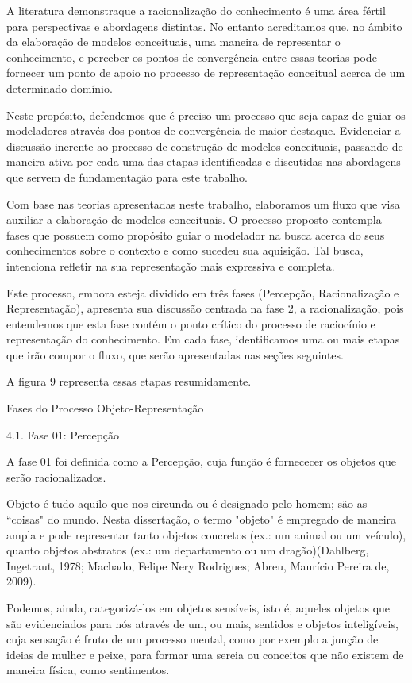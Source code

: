 A literatura demonstraque a racionalização do conhecimento é uma área fértil para perspectivas e abordagens distintas. No entanto acreditamos que, no âmbito da elaboração de modelos conceituais, uma maneira de representar o conhecimento, e perceber os pontos de convergência entre essas teorias pode fornecer um ponto de apoio no processo de representação conceitual acerca de um determinado domínio.

Neste propósito, defendemos que é preciso um processo que seja capaz de guiar os modeladores através dos pontos de convergência de maior destaque. Evidenciar a discussão inerente ao processo de construção de modelos conceituais, passando de maneira ativa por cada uma das etapas identificadas e discutidas nas abordagens que servem de fundamentação para este trabalho.

Com base nas teorias apresentadas neste trabalho, elaboramos um fluxo que visa auxiliar a elaboração de modelos conceituais. O processo proposto contempla fases que possuem como propósito guiar o modelador na busca acerca do seus conhecimentos sobre o contexto e como sucedeu sua aquisição. Tal busca, intenciona refletir na sua representação mais expressiva e completa.

Este processo, embora esteja dividido em três fases (Percepção, Racionalização e Representação), apresenta sua discussão centrada na fase 2, a racionalização, pois entendemos que esta fase contém o ponto crítico do processo de raciocínio e representação do conhecimento. Em cada fase, identificamos uma ou mais etapas que irão compor o fluxo, que serão apresentadas nas seções seguintes.

A figura 9 representa essas etapas resumidamente.


Fases do Processo Objeto-Representação



4.1. Fase 01: Percepção

A fase 01 foi definida como a Percepção, cuja função é fornececer os objetos que serão racionalizados.

Objeto é tudo aquilo que nos circunda ou é designado pelo homem; são as ``coisas" do mundo. Nesta dissertação, o termo "objeto" é empregado de maneira ampla e pode representar tanto objetos concretos (ex.: um animal ou um veículo), quanto objetos abstratos (ex.: um departamento ou um dragão)(Dahlberg, Ingetraut, 1978; Machado, Felipe Nery Rodrigues; Abreu, Maurício Pereira de, 2009).

Podemos, ainda, categorizá-los em objetos sensíveis, isto é, aqueles objetos que são evidenciados para nós através de um, ou mais, sentidos e objetos inteligíveis, cuja sensação é fruto de um processo mental, como por exemplo a junção de ideias de mulher e peixe, para formar uma sereia ou conceitos que não existem de maneira física, como sentimentos.

